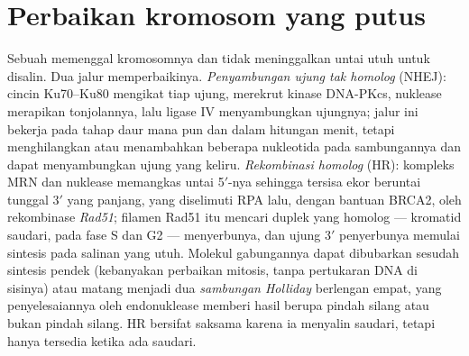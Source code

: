 \section{Perbaikan kromosom yang putus}

\begin{definition}\label{def:b3:dna-repair:dsb}
%
Sebuah \emph{} memenggal kromosomnya dan tidak meninggalkan
untai utuh untuk disalin. Dua jalur memperbaikinya. \emph{Penyambungan ujung
tak homolog} (NHEJ): cincin Ku70--Ku80 mengikat tiap ujung, merekrut kinase
DNA-PKcs, nuklease merapikan tonjolannya, lalu ligase IV menyambungkan
ujungnya; jalur ini bekerja pada tahap daur mana pun dan dalam hitungan menit,
tetapi menghilangkan atau menambahkan beberapa nukleotida pada sambungannya
dan dapat menyambungkan ujung yang keliru. \emph{Rekombinasi homolog} (HR):
kompleks MRN dan nuklease memangkas untai 5$'$-nya sehingga tersisa ekor
beruntai tunggal 3$'$ yang panjang, yang diselimuti RPA lalu, dengan bantuan
BRCA2, oleh rekombinase \emph{Rad51}; filamen Rad51 itu mencari duplek yang
homolog --- kromatid saudari, pada fase S dan G2 --- menyerbunya, dan ujung
3$'$ penyerbunya memulai sintesis pada salinan yang utuh. Molekul gabungannya
dapat dibubarkan sesudah sintesis pendek (kebanyakan perbaikan mitosis, tanpa
pertukaran DNA di sisinya) atau matang menjadi dua \emph{sambungan Holliday}
berlengan empat, yang penyelesaiannya oleh endonuklease memberi hasil berupa
pindah silang atau bukan pindah silang. HR bersifat saksama karena ia menyalin
saudari, tetapi hanya tersedia ketika ada saudari.
\end{definition}

